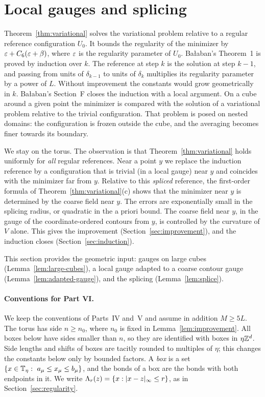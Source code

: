 \section{Local gauges and splicing}\label{sec:local-gauges}

Theorem~\ref{thm:variational} solves the variational problem relative to a regular reference configuration $U_0$. It bounds the regularity of the minimizer by $\varepsilon+C_6(\varepsilon+\beta)$, where $\varepsilon$ is the regularity parameter of $U_0$. Ba\l aban's Theorem~1 \cite{BalVar} is proved by induction over $k$. The reference at step $k$ is the solution at step $k-1$, and passing from units of $\delta_{k-1}$ to units of $\delta_k$ multiplies its regularity parameter by a power of $L$. Without improvement the constants would grow geometrically in $k$. Ba\l aban's Section~F \cite{BalVar} closes the induction with a local argument. On a cube around a given point the minimizer is compared with the solution of a variational problem relative to the trivial configuration. That problem is posed on nested domains: the configuration is frozen outside the cube, and the averaging becomes finer towards its boundary.

We stay on the torus. The observation is that Theorem~\ref{thm:variational} holds uniformly for \emph{all} regular references. Near a point $y$ we replace the induction reference by a configuration that is trivial (in a local gauge) near $y$ and coincides with the minimizer far from $y$. Relative to this \emph{spliced} reference, the first-order formula of Theorem~\ref{thm:variational}(c) shows that the minimizer near $y$ is determined by the coarse field near $y$. The errors are exponentially small in the splicing radius, or quadratic in the a priori bound. The coarse field near $y$, in the gauge of the coordinate-ordered contours from $y$, is controlled by the curvature of $V$ alone. This gives the improvement (Section~\ref{sec:improvement}), and the induction closes (Section~\ref{sec:induction}).

This section provides the geometric input: gauges on large cubes (Lemma~\ref{lem:large-cubes}), a local gauge adapted to a coarse contour gauge (Lemma~\ref{lem:adapted-gauge}), and the splicing (Lemma~\ref{lem:splice}).

\paragraph{Conventions for Part VI.} We keep the conventions of Parts~IV and~V and assume in addition $M\ge5L$. The torus has side $n\ge n_0$, where $n_0$ is fixed in Lemma~\ref{lem:improvement}. All boxes below have sides smaller than $n$, so they are identified with boxes in $\eta\mathbb Z^d$. Side lengths and shifts of boxes are tacitly rounded to multiples of $\eta$; this changes the constants below only by bounded factors. A \emph{box} is a set $\{x\in\mathbb T_\eta:\ a_\mu\le x_\mu\le b_\mu\}$, and the bonds of a box are the bonds with both endpoints in it. We write $\Lambda_r(z)=\{x:|x-z|_\infty\le r\}$, as in Section~\ref{sec:regularity}.

